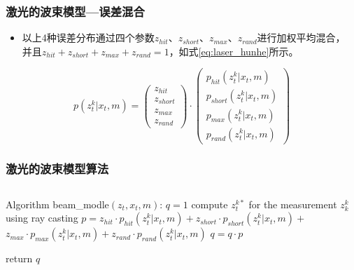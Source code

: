 \begin{frame}
  \frametitle{激光的波束模型---误差混合}
  \begin{itemize}
    \item 以上4种误差分布通过四个参数$z_{hit}$、$z_{short}$、$z_{max}$、$z_{rand}$进行加权平均混合，
          并且$z_{hit} + z_{short} + z_{max} + z_{rand} = 1$，如式\ref{eq:laser_hunhe}所示。
  \end{itemize}

  \begin{equation}
    p(z_t^k | x_t, m) = 
    \begin{pmatrix}
      z_{hit} \\ z_{short} \\ z_{max} \\ z_{rand}
    \end{pmatrix}
    \cdot 
    \begin{pmatrix}
      p_{hit}(z_t^k | x_t, m) \\p_{short}(z_t^k | x_t, m) \\ p_{max}(z_t^k | x_t, m) \\ p_{rand}(z_t^k | x_t, m)
    \end{pmatrix}
    \label{eq:laser_hunhe}
  \end{equation}
\end{frame}

\begin{frame}[fragile]
  \frametitle{激光的波束模型算法}

  \begin{columns}%
  \begin{block}
    
    \begin{algorithmic}[1]
        \State Algorithm beam\_modle$(z_t, x_t, m)$:
        \State $q = 1$
        \State compute $z_t^{k*}$ for the measurement $z_k^k$ using ray casting 
        \State $p = z_{hit} \cdot p_{hit}(z_t^k|x_t, m) + z_{short} \cdot p_{short}(z_t^k|x_t, m) + $
        \Statex     \qquad\quad       $z_{max} \cdot p_{max}(z_t^k|x_t, m) + z_{rand} \cdot p_{rand}(z_t^k|x_t, m)$
        \State $q = q \cdot p$
        \EndFor

        \State return $q$

    \end{algorithmic}
  \end{block}
\end{columns}
\end{frame}

